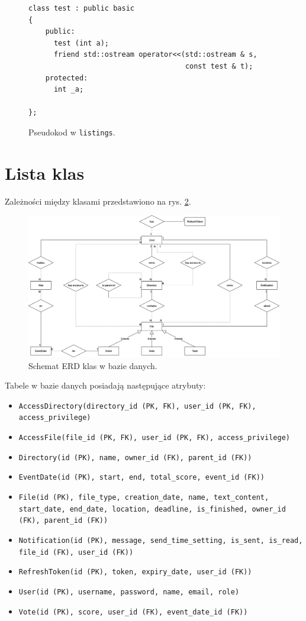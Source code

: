 \documentclass[a4paper,twoside,12pt]{book}
\begin{document}
\begin{figure}
\centering
\begin{lstlisting}
class test : public basic
{
    public:
      test (int a);
      friend std::ostream operator<<(std::ostream & s, 
                                     const test & t);
    protected:
      int _a;  
      
};
\end{lstlisting}
\caption{Pseudokod w \texttt{listings}.}
\label{fig:pseudokod:listings}
\end{figure}

\section{Lista klas}

Zależności między klasami przedstawiono na rys. \ref{fig:erd}.

\begin{figure}
\centering
\includegraphics[width=\textwidth]{./ERD.png}
\caption{Schemat ERD klas w bazie danych.}
\label{fig:erd}
\end{figure}

Tabele w bazie danych posiadają następujące atrybuty:
\begin{itemize}
	\item \texttt{AccessDirectory(directory_id (PK, FK), user_id (PK, FK), access_privilege)} 
	\item \texttt{AccessFile(file_id (PK, FK), user_id (PK, FK), access_privilege)} 
	\item \texttt{Directory(id (PK), name, owner_id (FK), parent_id (FK))} 
	\item \texttt{EventDate(id (PK), start, end, total_score, event_id (FK))} 
	\item \texttt{File(id (PK), file_type, creation_date, name, text_content, start_date, end_date, location, deadline, is_finished, owner_id (FK), parent_id (FK))}
	\item \texttt{Notification(id (PK), message, send_time_setting, is_sent, is_read, file_id (FK), user_id (FK))}
	\item \texttt{RefreshToken(id (PK), token, expiry_date, user_id (FK))}
	\item \texttt{User(id (PK), username, password, name, email, role)}
	\item \texttt{Vote(id (PK), score, user_id (FK), event_date_id (FK))}
\end{itemize}
\end{document}
